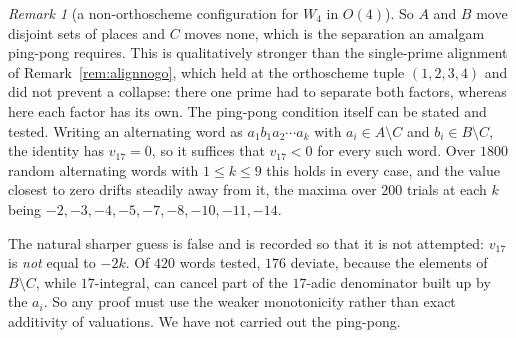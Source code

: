 \documentclass[11pt]{article}
\theoremstyle{definition}
\theoremstyle{remark}
\newtheorem{remark}[theorem]{Remark}
\theoremstyle{definition}
\begin{document}
\begin{remark}[a non-orthoscheme configuration for $W_4$ in $O(4)$]
So $A$ and $B$ move disjoint sets of places and $C$ moves none, which is the separation an
amalgam ping-pong requires. This is qualitatively stronger than the single-prime alignment of
Remark~\ref{rem:alignnogo}, which held at the orthoscheme tuple $(1,2,3,4)$ and did not prevent a
collapse: there one prime had to separate both factors, whereas here each factor has its own.
The ping-pong condition itself can be stated and tested. Writing an alternating word as
$a_1b_1a_2\cdots a_k$ with $a_i\in A\setminus C$ and $b_i\in B\setminus C$, the identity has
$v_{17}=0$, so it suffices that $v_{17}<0$ for every such word. Over $1800$ random alternating
words with $1\le k\le9$ this holds in every case, and the value closest to zero drifts steadily
away from it, the maxima over $200$ trials at each $k$ being
$-2,-3,-4,-5,-7,-8,-10,-11,-14$.

The natural sharper guess is false and is recorded so that it is not attempted: $v_{17}$ is
\emph{not} equal to $-2k$. Of $420$ words tested, $176$ deviate, because the elements of
$B\setminus C$, while $17$-integral, can cancel part of the $17$-adic denominator built up by the
$a_i$. So any proof must use the weaker monotonicity rather than exact additivity of valuations.
We have not carried out the ping-pong.


\end{remark}
\end{document}
